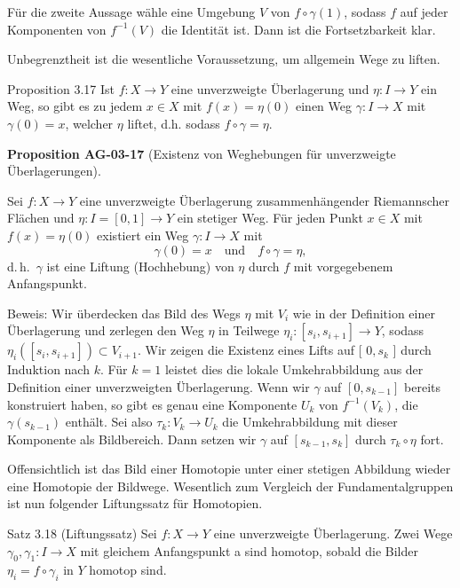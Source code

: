 \documentclass[10pt, letterpaper]{article}
\newcommand{\CustomHeading}[3]{%
  \par\medskip\noindent%
  \textbf{#1 #2} \textnormal{(#3)}.\enskip%
}
\newenvironment{PROP}[2]{\begin{unitbox}\CustomHeading{Proposition}{#1}{#2}}{\end{unitbox}}
\begin{document}
Für die zweite Aussage wähle eine Umgebung $V$ von $f \circ \gamma(1)$, sodass $f$ auf jeder Komponenten von $f^{-1}(V)$ die Identität ist. Dann ist die Fortsetzbarkeit klar.



Unbegrenztheit ist die wesentliche Voraussetzung, um allgemein Wege zu liften.


Proposition 3.17 Ist $f: X \rightarrow Y$ eine unverzweigte Überlagerung und $\eta: I \rightarrow Y$ ein Weg, so gibt es zu jedem $x \in X$ mit $f(x)=\eta(0)$ einen Weg $\gamma: I \rightarrow X$ mit $\gamma(0)=x$, welcher $\eta$ liftet, d.h. sodass $f \circ \gamma=\eta$.

\begin{PROP}{AG-03-17}{Existenz von Weghebungen für unverzweigte Überlagerungen}
Sei $f:X\to Y$ eine unverzweigte Überlagerung zusammenhängender Riemannscher Flächen
und $\eta:I=[0,1]\to Y$ ein stetiger Weg. Für jeden Punkt $x\in X$ mit
$f(x)=\eta(0)$ existiert ein Weg $\gamma:I\to X$ mit
\[
\gamma(0)=x \quad\text{und}\quad f\circ\gamma=\eta,
\]
d.\,h.\ $\gamma$ ist eine Liftung (Hochhebung) von $\eta$ durch $f$ mit vorgegebenem Anfangspunkt.
\end{PROP}


Beweis: Wir überdecken das Bild des Wegs $\eta$ mit $V_{i}$ wie in der Definition einer Überlagerung und zerlegen den Weg $\eta$ in Teilwege $\eta_{i}:\left[s_{i}, s_{i+1}\right] \rightarrow Y$, sodass $\eta_{i}\left(\left[s_{i}, s_{i+1}\right]\right) \subset V_{i+1}$. Wir zeigen die Existenz eines Lifts auf [ $0, s_{k}$ ] durch Induktion nach $k$. Für $k=1$ leistet dies die lokale Umkehrabbildung aus der Definition einer unverzweigten Überlagerung. Wenn wir $\gamma$ auf $\left[0, s_{k-1}\right]$ bereits konstruiert haben, so gibt es genau eine Komponente $U_{k}$ von $f^{-1}\left(V_{k}\right)$, die $\gamma\left(s_{k-1}\right)$ enthält. Sei also $\tau_{k}: V_{k} \rightarrow U_{k}$ die Umkehrabbildung mit dieser Komponente als Bildbereich. Dann setzen wir $\gamma$ auf $\left[s_{k-1}, s_{k}\right]$ durch $\tau_{k} \circ \eta$ fort.

Offensichtlich ist das Bild einer Homotopie unter einer stetigen Abbildung wieder eine Homotopie der Bildwege. Wesentlich zum Vergleich der Fundamentalgruppen ist nun folgender Liftungssatz für Homotopien.

Satz 3.18 (Liftungssatz) Sei $f: X \rightarrow Y$ eine unverzweigte Überlagerung. Zwei Wege $\gamma_{0}, \gamma_{1}: I \rightarrow X$ mit gleichem Anfangspunkt a sind homotop, sobald die Bilder $\eta_{i}=f \circ \gamma_{i}$ in $Y$ homotop sind.
\end{document}
